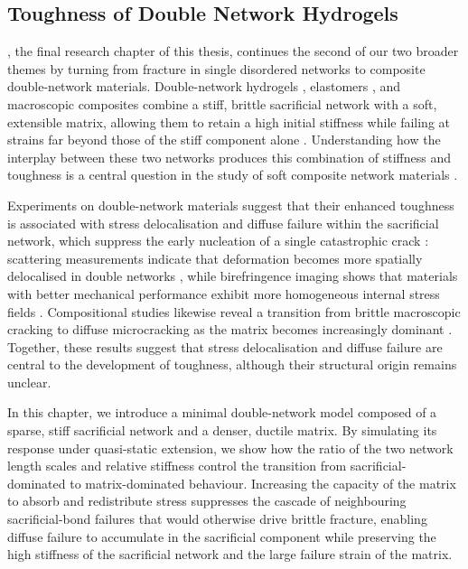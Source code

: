 \documentclass[asymmetricmargins]{library/duthesis}%
\begin{document}
\subsection*{Toughness of Double Network Hydrogels}
, the final research chapter of this thesis, continues the second of our two broader themes by turning from fracture in single disordered networks to composite double-network materials. Double-network hydrogels \cite{gong_why_2010, nakajima_synthesis_2013, sun_highly_2012, xin_effect_2013}, elastomers \cite{ducrot_toughening_2014, millereauMechanicsElastomericMolecular2018}, and macroscopic composites \cite{kingMacroscaleDoubleNetworks2019,takahashiCreatingStiffTough2018} combine a stiff, brittle sacrificial network with a soft, extensible matrix, allowing them to retain a high initial stiffness while failing at strains far beyond those of the stiff component alone \cite{gong_double-network_2003,gong_why_2010,ducrot_toughening_2014,millereauMechanicsElastomericMolecular2018}. Understanding how the interplay between these two networks produces this combination of stiffness and toughness is a central question in the study of soft composite network materials \cite{Creton50th2017,gong_why_2010,kingMacroscaleDoubleNetworks2019,tauber_stretchy_2022}.

Experiments on double-network materials suggest that their enhanced toughness is associated with stress delocalisation and diffuse failure within the sacrificial network, which suppress the early nucleation of a single catastrophic crack \cite{ducrot_structure_2015,huang_importance_2007,zheng_how_2021,fukao_effect_2020,ju_role_nodate}: scattering measurements indicate that deformation becomes more spatially delocalised in double networks \cite{ducrot_structure_2015,tominaga_molecular_2007,Orr2026}, while birefringence imaging shows that materials with better mechanical performance exhibit more homogeneous internal stress fields \cite{gong_double-network_2003,zheng_how_2021}. Compositional studies likewise reveal a transition from brittle macroscopic cracking to diffuse microcracking as the matrix becomes increasingly dominant \cite{fukao_effect_2020,ju_role_nodate,tauber_sharing_2021}. Together, these results suggest that stress delocalisation and diffuse failure are central to the development of toughness, although their structural origin remains unclear.

In this chapter, we introduce a minimal double-network model composed of a sparse, stiff sacrificial network and a denser, ductile matrix. By simulating its response under quasi-static extension, we show how the ratio of the two network length scales and relative stiffness control the transition from sacrificial-dominated to matrix-dominated behaviour. Increasing the capacity of the matrix to absorb and redistribute stress suppresses the cascade of neighbouring sacrificial-bond failures that would otherwise drive brittle fracture, enabling diffuse failure to accumulate in the sacrificial component while preserving the high stiffness of the sacrificial network and the large failure strain of the matrix. 
\end{document}

